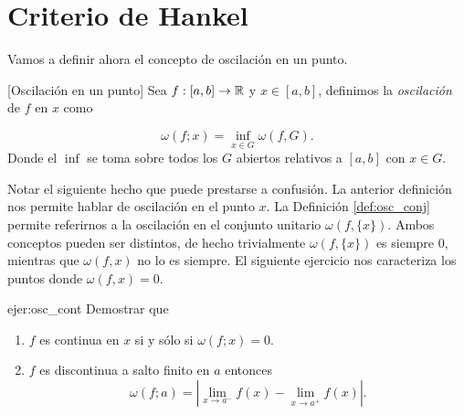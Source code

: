 








\section{Criterio de Hankel}


Vamos a definir ahora el concepto de oscilación en un punto.


\begin{definicion}{}[Oscilación en un punto] Sea $f:[a,b]\to\mathbb{R}$ y $x\in [a,b]$, definimos la  \emph{oscilación} de $f$ en $x$ como

\[
 \omega(f;x)=\inf\limits_{x\in G}\omega(f,G).
\]
Donde el $\inf$ se toma sobre todos los $G$ abiertos relativos a $[a,b]$ con $x\in G$.  

 
\end{definicion}


\begin{observa} Notar el siguiente hecho que puede prestarse a confusión. La anterior definición nos permite hablar de oscilación en el punto $x$. La Definición \ref{def:osc_conj} permite referirnos a la oscilación en el conjunto unitario  $\omega(f,\{x\})$. Ambos conceptos pueden ser distintos, de hecho  trivialmente  $\omega(f,\{x\})$ es siempre $0$, mientras que  $\omega(f,x)$ no lo es siempre. El siguiente ejercicio nos caracteriza los puntos donde  $\omega(f,x)=0$.
 
\end{observa}


\begin{ejercicio}{ejer:osc_cont}
 Demostrar que 
\begin{enumerate}[label=\emph{\alph*})]
 \item  $f$ es continua en $x$ si y sólo si $\omega(f;x)=0$.
 \item $f$ es discontinua a salto finito en $a$ entonces 
 $$\omega(f;a)=|\lim\limits_{x\to a^-}f(x)-\lim\limits_{x\to a^+}f(x)|.$$
 \end{enumerate}
 
\end{ejercicio}




